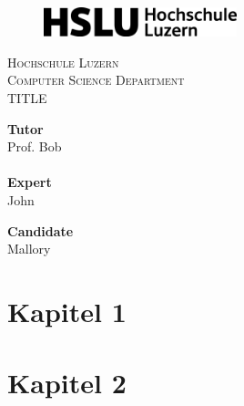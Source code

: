 \documentclass[10.5pt]{article}
\begin{document}


\begin{titlepage}
\begin{figure}[t]
    \centering\includegraphics[width=0.5\textwidth]{HSLU2022logo.svg.png}
\end{figure}

\begin{center}
    \textsc{\LARGE{Hochschule Luzern\\}}
	\textsc{ \LARGE{Computer Science Department\\ }}
	\vspace{40mm}
	\fontsize{10mm}{7mm}\selectfont 
    \textup{TITLE}\\
\end{center}

\vspace{25mm}

\begin{minipage}[t]{0.47\textwidth}
	\textnormal{\large{\bf Tutor\\}}
	{\large Prof. Bob\\ \\}
 \textnormal{\large{\bf Expert\\}}
	{\large John}
\end{minipage}\hfill\begin{minipage}[t]{0.47\textwidth}\raggedleft
	\textnormal{\large{\bf Candidate\\}}
	{\large Mallory}
\end{minipage}

\vspace{20mm}


\end{titlepage}


\newpage


\section{Kapitel 1}
\lipsum[10]

\section{Kapitel 2}
\end{document}
